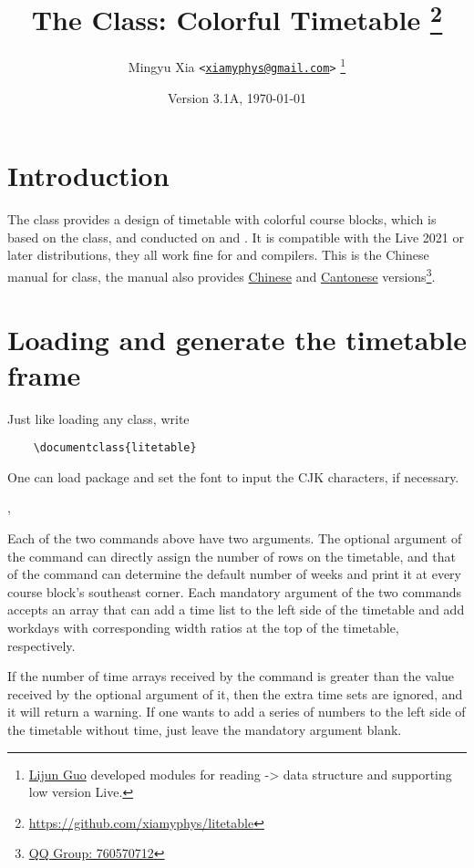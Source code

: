 \documentclass[letterpaper]{l3doc}
\title
{ \bfseries
  The \cls{litetable} Class: Colorful Timetable
  \thanks{\url{https://github.com/xiamyphys/litetable}}
}
\author
{
  Mingyu Xia \texttt{<\href{mailto:xiamyphys@gmail.com}{xiamyphys@gmail.com}>}
  \thanks{\href{https://github.com/ljguo1020}{Lijun Guo} developed modules for reading \meta{left} -> \meta{right} data structure and supporting low version \hologo {TeX} Live.}
}
\date{Version 3.1A, \today}
\begin{document}
\maketitle

\section{Introduction}

The  class provides a design of timetable with colorful course blocks, which is based on the  class, and conducted on  and . It is compatible with the Live 2021 or later distributions, they all work fine for  and  compilers. This is the Chinese manual for  class, the manual also provides \href{./litetable-cn.pdf}{Chinese} and \href{./litetable-hk.pdf}{Cantonese} versions\footnote{\href{https://qm.qq.com/q/RyssAhG4qy}{QQ Group: 760570712}}.

\section{Loading  and generate the timetable frame}

Just like loading any class, write

\begin{framed}
  \begin{verbatim}
    \documentclass{litetable}
  \end{verbatim}
\end{framed}

One can load  package and set the font to input the CJK characters, if necessary.

\begin{function}{\timelist,\weeklist}
  \begin{syntax}
                 
        
  \end{syntax}

  Each of the two commands above have two arguments. The optional argument of the command  can directly assign the number of rows on the timetable, and that of the command  can determine the default number of weeks and print it at every course block's southeast corner. Each mandatory argument of the two commands accepts an array that can add a time list to the left side of the timetable and add workdays with corresponding width ratios at the top of the timetable, respectively.

  If the number of time arrays received by the command  is greater than the value received by the optional argument of it, then the extra time sets are ignored, and it will return a warning. If one wants to add a series of numbers to the left side of the timetable without time, just leave the mandatory argument blank.
\end{function}
\end{document}
